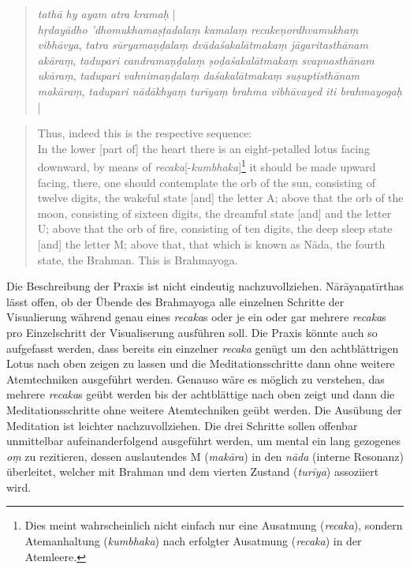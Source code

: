 \begin{quote}
\textit{tathā hy ayam atra kramaḥ} |\\ \textit{hṛdayādho 'dhomukhamaṣṭadalaṃ kamalaṃ recakeṇordhvamukhaṃ vibhāvya}, \textit{tatra sūryamaṇḍalaṃ dvādaśakalātmakaṃ jāgaritasthānam akāraṃ},
\textit{tadupari candramaṇḍalaṃ ṣoḍaśakalātmakaṃ svapnasthānam ukāraṃ}, \textit{tadupari vahnimaṇḍalaṃ daśakalātmakaṃ suṣuptisthānam makāraṃ}, \textit{tadupari nādākhyaṃ turīyaṃ brahma vibhāvayed iti brahmayogaḥ} |
\end{quote}
\begin{quote}
Thus, indeed this is the respective sequence: \\
In the lower [part of] the heart there is an eight-petalled lotus facing downward, by means of \textit{recaka}[-\textit{kumbhaka}]\footnote{Dies meint wahrscheinlich nicht einfach nur eine Ausatmung (\textit{recaka}), sondern Atemanhaltung (\textit{kumbhaka}) nach erfolgter Ausatmung (\textit{recaka}) in der Atemleere.} it should be made upward facing, there, one should contemplate the orb of the sun, consisting of twelve digits, the wakeful state [and] the letter A; above that the orb of the moon, consisting of sixteen digits, the dreamful state [and] and the letter U; above that the orb of fire, consisting of ten digits, the deep sleep state [and] the letter M; above that, that which is known as Nāda, the fourth state, the Brahman. This is Brahmayoga. 
\end{quote}

Die Beschreibung der Praxis ist nicht eindeutig nachzuvollziehen. Nārāyaṇatīrthas lässt offen, ob der Übende des Brahmayoga alle einzelnen Schritte der Visualierung während genau eines \textit{recaka}s oder je ein oder gar mehrere \textit{recaka}s pro Einzelschritt der Visualiserung ausführen soll. Die Praxis könnte auch so aufgefasst werden, dass bereits ein einzelner \textit{recaka} genügt um den achtblättrigen Lotus nach oben zeigen zu lassen und die Meditationsschritte dann ohne weitere Atemtechniken ausgeführt werden. Genauso wäre es möglich zu verstehen, das mehrere \textit{recaka}s geübt werden bis der achtblättige nach oben zeigt und dann die Meditationsschritte ohne weitere Atemtechniken geübt werden.
Die Ausübung der Meditation ist leichter nachzuvollziehen. Die drei Schritte sollen offenbar unmittelbar aufeinanderfolgend ausgeführt werden, um mental ein lang gezogenes \textit{oṃ} zu rezitieren, dessen auslautendes M (\textit{makāra}) in den \textit{nāda} (interne Resonanz) überleitet, welcher mit Brahman und dem vierten Zustand (\textit{turīya}) assoziiert wird.

